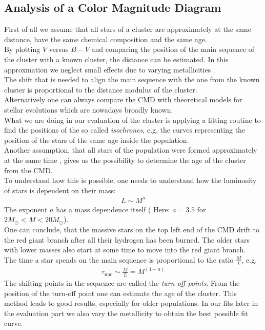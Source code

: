 \subsection{Analysis of a Color Magnitude Diagram}
First of all we assume that all stars of a cluster are approximately at the same distance, have the same chemical composition and the same age. \\
By plotting $V$ versus $B-V$ and comparing the position of the main sequence of the cluster with a known cluster, the distance can be estimated. In this approxmation we neglect small effects due to varying metallicities . \\
The shift that is needed to align the main sequence with the one from the known cluster is proportional to the distance modulus of the cluster. \\
Alternatively one can always compare the CMD with theoretical models for stellar evolutions which are nowadays broadly known. \\
What we are doing in our evaluation of the cluster is applying a fitting routine to find the positions of the so called \textit{isochrones}, e.g. the curves representing the position of the stars of the same age inside the population. \\
Another assumption, that all stars of the population were  formed approximately at the same time , gives us the possibility to determine the age of the cluster from the CMD. \\
To understand how this is possible, one needs to understand how the luminosity of stars is dependent on their mass:
\begin{align}
	L \sim M^a
\end{align}
 The exponent $a$ has a mass dependence itself ( Here: $a = 3.5 $ for $2M_{\odot} < M < 20M_{\odot}$). \\ One can conclude, that the massive stars on the top left end of the CMD drift to the red giant branch after all their hydrogen has been burned. The older stars with lower masses also start at some time to move into the red giant branch. \\
 The time a star spends on the main sequence is proportional to the ratio $\frac{M}{L}$, e.g.
 \begin{align}
 	\tau_{\text{nuc}} \sim \frac{M}{L} = M^{(1-a)}
 \end{align}
 The shifting points in the sequence are called the \textit{turn-off points}. From the position of the turn-off point one can estimate the age of the cluster. This method leads to good results, especially for older populations. In our fits later in the evaluation part we also vary the metallicity to obtain the best possible fit curve. 
